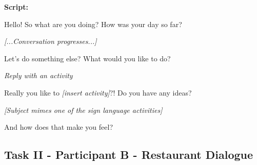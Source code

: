 \textbf{Script:}

\begin{description}
  \item Hello! So what are you doing? How was your day so far?
  \item \textit{[...Conversation progresses...]}
  \item Let's do something else? What would you like to do?
  \item \textit{Reply with an activity}
  \item Really you like to \textit{[insert activity]}?! Do you have any ideas?
  \item \textit{[Subject mimes one of the sign language activities]}
  \item And how does that make you feel?
\end{description}

\subsection{Task II - Participant B - Restaurant Dialogue}

